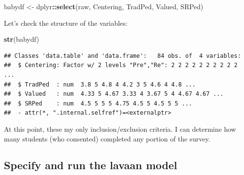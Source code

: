 \documentclass[
  11pt,
]{book}
\newenvironment{Shaded}{\begin{snugshade}}{\end{snugshade}}
\newcommand{\FunctionTok}[1]{\textcolor[rgb]{0.27,0.27,0.27}{\textbf{#1}}}
\newcommand{\NormalTok}[1]{#1}
\newcommand{\OtherTok}[1]{\textcolor[rgb]{0.37,0.37,0.37}{#1}}
\newcommand{\SpecialCharTok}[1]{\textcolor[rgb]{0.43,0.43,0.43}{\textbf{#1}}}
\begin{document}
\begin{Shaded}
\begin{Highlighting}[]
\NormalTok{babydf }\OtherTok{\textless{}{-}}\NormalTok{ dplyr}\SpecialCharTok{::}\FunctionTok{select}\NormalTok{(raw, Centering, TradPed, Valued, SRPed)}
\end{Highlighting}
\end{Shaded}

Let's check the structure of the variables:

\begin{Shaded}
\begin{Highlighting}[]
\FunctionTok{str}\NormalTok{(babydf)}
\end{Highlighting}
\end{Shaded}

\begin{verbatim}
## Classes 'data.table' and 'data.frame':   84 obs. of  4 variables:
##  $ Centering: Factor w/ 2 levels "Pre","Re": 2 2 2 2 2 2 2 2 2 2 ...
##  $ TradPed  : num  3.8 5 4.8 4 4.2 3 5 4.6 4 4.8 ...
##  $ Valued   : num  4.33 5 4.67 3.33 4 3.67 5 4 4.67 4.67 ...
##  $ SRPed    : num  4.5 5 5 5 4.75 4.5 5 4.5 5 5 ...
##  - attr(*, ".internal.selfref")=<externalptr>
\end{verbatim}

At this point, these my only inclusion/exclusion criteria. I can determine how many students (who consented) completed any portion of the survey.

\hypertarget{specify-and-run-the-lavaan-model-1}{%
\subsection*{Specify and run the lavaan model}\label{specify-and-run-the-lavaan-model-1}}
\end{document}
